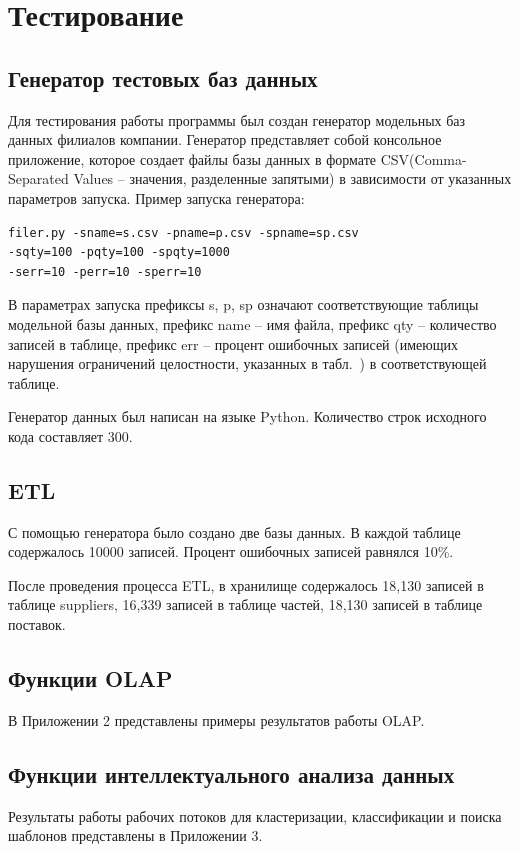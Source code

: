 \section{Тестирование}

\subsection{Генератор тестовых баз данных}
Для тестирования работы программы был создан генератор модельных баз данных филиалов компании. Генератор представляет собой консольное приложение, которое создает файлы базы данных в формате CSV(Comma-Separated  Values – значения, разделенные запятыми) в зависимости от указанных параметров запуска. Пример запуска генератора: 
\begin{lstlisting}
filer.py -sname=s.csv -pname=p.csv -spname=sp.csv
-sqty=100 -pqty=100 -spqty=1000	
-serr=10 -perr=10 -sperr=10
\end{lstlisting}
В параметрах запуска префиксы s, p, sp означают соответствующие таблицы модельной базы данных, префикс name – имя файла, префикс qty – количество записей в таблице, префикс err – процент ошибочных записей (имеющих  нарушения  ограничений  целостности,  указанных  в табл.~) в соответствующей таблице.\par
Генератор данных был написан на языке Python. Количество строк исходного кода составляет 300.\par

\subsection{ETL}
С помощью генератора было создано две базы данных. В каждой таблице содержалось 10000 записей. Процент ошибочных записей равнялся 10\%.\par
После проведения процесса ETL, в хранилище содержалось 18,130 записей в таблице suppliers, 16,339 записей в таблице частей, 18,130 записей в таблице поставок.

\subsection{Функции OLAP}
В Приложении 2 представлены примеры результатов работы OLAP.

\subsection{Функции интеллектуального анализа данных}
Результаты работы рабочих потоков для кластеризации, классификации и поиска шаблонов представлены в Приложении 3.

